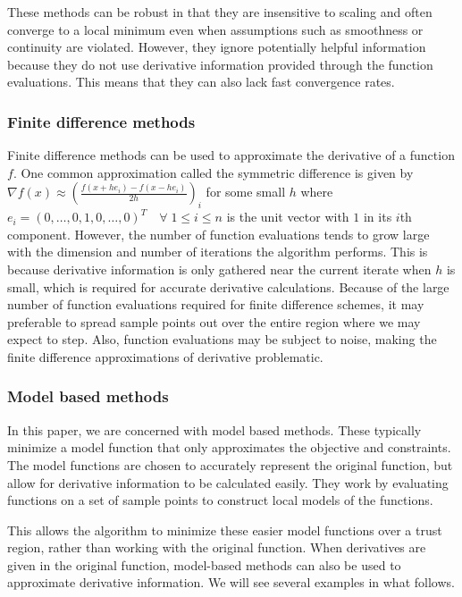 \documentclass{article}
\begin{document}
These methods can be robust in that they are insensitive to scaling and often converge to a local minimum even when assumptions such as smoothness or continuity are violated.
However, they ignore potentially helpful information because they do not use derivative information provided through the function evaluations.
This means that they can also lack fast convergence rates.


\subsubsection{Finite difference methods}

Finite difference methods can be used to approximate the derivative of a function $f$.
One common approximation called the symmetric difference is given by $\nabla f(x) \approx (\frac{f(x+he_i) - f(x-he_i)}{2h})_i$ for some small $h$ where $e_i = (0,\ldots, 0, 1, 0, \ldots, 0)^T \quad \forall \; 1 \le i \le n$ is the unit vector with $1$ in its $i$th component.
However, the number of function evaluations tends to grow large with the dimension and number of iterations the algorithm performs.
This is because derivative information is only gathered near the current iterate when $h$ is small, which is required for accurate derivative calculations.
Because of the large number of function evaluations required for finite difference schemes, it may preferable to spread sample points out over the entire region where we may expect to step.
Also, function evaluations may be subject to noise, making the finite difference approximations of derivative problematic.

\subsubsection{Model based methods}

In this paper, we are concerned with model based methods.
These typically minimize a model function that only approximates the objective and constraints.
The model functions are chosen to accurately represent the original function, but allow for derivative information to be calculated easily.
They work by evaluating functions on a set of sample points to construct local models of the functions.

This allows the algorithm to minimize these easier model functions over a trust region, rather than working with the original function.
When derivatives are given in the original function, model-based methods can also be used to approximate derivative information.
We will see several examples in what follows.
\end{document}
